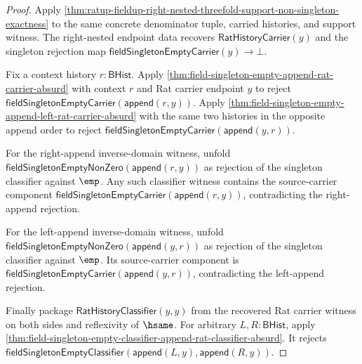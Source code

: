 \begin{proof}
Apply
\autoref{thm:ratup-fieldup-right-nested-threefold-support-non-singleton-exactness}
to the same concrete denominator tuple, carried histories, and support witness.
The right-nested endpoint data recovers $\mathsf{RatHistoryCarrier}(y)$ and the
singleton rejection map $\mathsf{fieldSingletonEmptyCarrier}(y)\to\bot$.

Fix a context history $r:\mathsf{BHist}$. Apply
\autoref{thm:field-singleton-empty-append-rat-carrier-absurd} with context $r$
and Rat carrier endpoint $y$ to reject
$\mathsf{fieldSingletonEmptyCarrier}(\mathsf{append}(r,y))$. Apply
\autoref{thm:field-singleton-empty-append-left-rat-carrier-absurd} with the same
two histories in the opposite append order to reject
$\mathsf{fieldSingletonEmptyCarrier}(\mathsf{append}(y,r))$.

For the right-append inverse-domain witness, unfold
$\mathsf{fieldSingletonEmptyNonZero}(\mathsf{append}(r,y))$ as rejection of the
singleton classifier against $\emp$. Any such classifier witness contains the
source-carrier component
$\mathsf{fieldSingletonEmptyCarrier}(\mathsf{append}(r,y))$, contradicting the
right-append rejection.

For the left-append inverse-domain witness, unfold
$\mathsf{fieldSingletonEmptyNonZero}(\mathsf{append}(y,r))$ as rejection of the
singleton classifier against $\emp$. Its source-carrier component is
$\mathsf{fieldSingletonEmptyCarrier}(\mathsf{append}(y,r))$, contradicting the
left-append rejection.

Finally package $\mathsf{RatHistoryClassifier}(y,y)$ from the recovered Rat
carrier witness on both sides and reflexivity of $\hsame$. For arbitrary
$L,R:\mathsf{BHist}$, apply
\autoref{thm:field-singleton-empty-classifier-append-rat-classifier-absurd}.
It rejects
$\mathsf{fieldSingletonEmptyClassifier}(\mathsf{append}(L,y),\mathsf{append}(R,y))$.
\end{proof}

